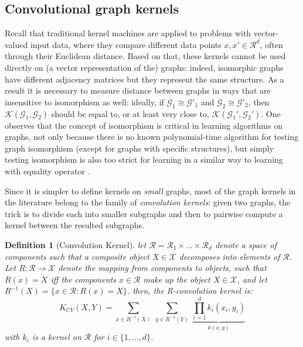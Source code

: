 \subsection{Convolutional graph kernels}
Recall that traditional kernel machines are applied to problems with vector-valued input data, where they compare different data points $x,x' \in \mathcal{R}^d$, often through their Euclidean distance. Based on that, these kernels cannot be used directly on (a vector representation of the) graphs: indeed, isomorphic graphs have different adjacency matrices but they represent the same structure. As a result it is necessary to measure distance between graphs in ways that are insensitive to isomorphism as well: ideally, if $\mathcal{G}_1 \cong \mathcal{G}'_1$ and $\mathcal{G}_2 \cong \mathcal{G}'_2$, then $\mathcal{K}(\mathcal{G}_1, \mathcal{G}_2)$ should be equal to, or at least very close to, $\mathcal{K}(\mathcal{G}_1', \mathcal{G}_2')$. One observes that the concept of isomorphism is critical in learning algorithms on graphs, not only because there is no known polynomial-time algorithm for testing graph isomorphism (except for graphs with specific structures), but simply testing isomorphism is also too strict for learning in a similar way to learning with equality operator \citep{kriege_graph_kernels}.

Since it is simpler to define kernels on \emph{small} graphs, most of the graph kernels in the literature belong to the family of \emph{convolution kernels}: given two graphs, the trick is to divide each into smaller subgraphs and then to pairwise compute a kernel between the resulted subgraphs.
\newtheorem{definition}{Definition} 
\begin{definition}[Convolution Kernel]
let $\mathcal{R}=\mathcal{R}_1\times...\times \mathcal{R}_d$ denote a space of components such that a composite object $X\in \mathcal{X}$ decomposes into elements of $\mathcal{R}$. Let $R:\mathcal{R}\xrightarrow{}\mathcal{X}$ denote the mapping from components to objects, such that $R(x)=X$ iff the components $x\in \mathcal{R}$ make up the object $X\in \mathcal{X}$, and let $R^{-1}(X)=\{x\in\mathcal{R}:R(x)=X\}$. then, the R-convolution kernel is:
\begin{equation}
\label{eq:conolutional_kernels}
    K_{CV}(X,Y)=\sum_{x\in R^{-1}(X)}~\sum_{y\in R^{-1}(Y)}~\underbrace{\prod_{i=1}^{d}k_i(x_i,y_i)}_{k(x,y)}
\end{equation}
with $k_i$ is a kernel on $\mathcal{R}$ for $i\in\{1,...,d\}$.
\end{definition}

